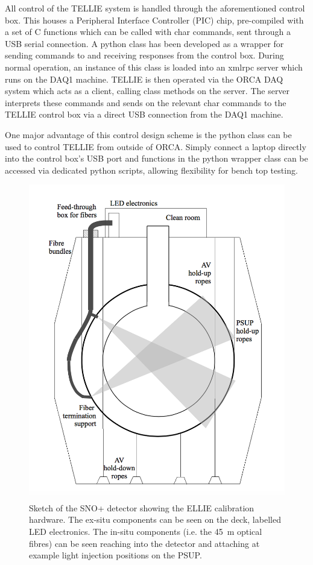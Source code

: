\documentclass[12pt]{report}
\begin{document}
All control of the TELLIE system is handled through the aforementioned control box. This houses a Peripheral Interface Controller (PIC) chip, pre-compiled with a set of C functions which can be called with char commands, sent through a USB serial connection. A python class has been developed as a wrapper for sending commands to and receiving responses from the control box. During normal operation, an instance of this class is loaded into an xmlrpc server which runs on the DAQ1 machine. TELLIE is then operated via the ORCA DAQ system which acts as a client, calling class methods on the server. The server interprets these commands and sends on the relevant char commands to the TELLIE control box via a direct USB connection from the DAQ1 machine. 

One major advantage of this control design scheme is the python class can be used to control TELLIE from outside of ORCA. Simply connect a laptop directly into the control box's USB port and functions in the python wrapper class can be accessed via dedicated python scripts, allowing flexibility for bench top testing. 


\begin{figure}[htbp]
	\begin{center}
		\includegraphics[scale=1]{TELLIE_in-situ}
		\caption{Sketch of the SNO+ detector showing the ELLIE calibration hardware. The ex-situ components can be seen on the deck, labelled LED electronics. The in-situ components (i.e. the 45~m optical fibres) can be seen reaching into the detector and attaching at example light injection positions on the PSUP.}
		\label{fig:SNO+_sketch}
	\end{center}
\end{figure}
\end{document}
